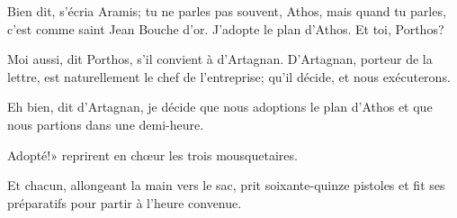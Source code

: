 \speak  Bien dit, s'écria Aramis; tu ne parles pas souvent, Athos, mais quand tu parles, c'est comme saint Jean Bouche d'or. J'adopte le plan d'Athos. Et toi, Porthos? 

\speak  Moi aussi, dit Porthos, s'il convient à d'Artagnan. D'Artagnan, porteur de la lettre, est naturellement le chef de l'entreprise; qu'il décide, et nous exécuterons. 

\speak  Eh bien, dit d'Artagnan, je décide que nous adoptions le plan d'Athos et que nous partions dans une demi-heure. 

\speak  Adopté!» reprirent en chœur les trois mousquetaires. 

Et chacun, allongeant la main vers le sac, prit soixante-quinze pistoles et fit ses préparatifs pour partir à l'heure convenue. 